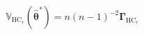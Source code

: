 \begin{equation}
	\mathbb{V}_{
		\mathrm{HC}_{r}
	}
	\left(
	\hat{
		\boldsymbol{\theta}
		}^{\ast}
	\right)
	=
	n
	\left(
	n - 1
	\right)^{-2}
	\boldsymbol{\Gamma}_{
		\mathrm{HC}_{r}
	}
\end{equation}
